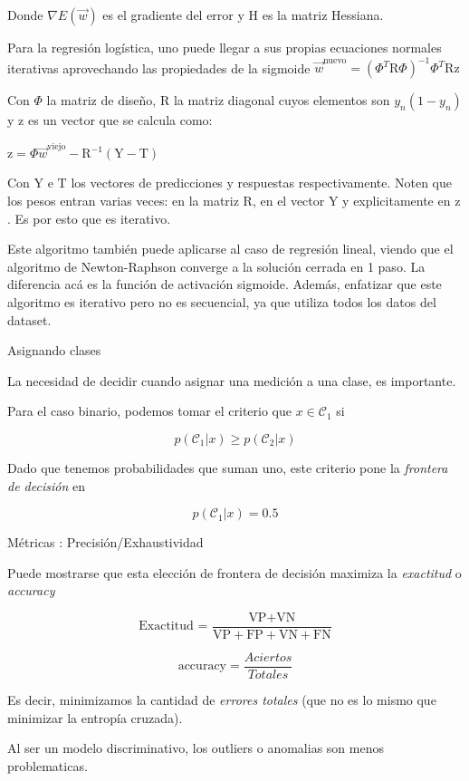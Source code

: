 \documentclass[twoside,11pt]{article}
\begin{document}
Donde $\nabla E(\vec{w})$ es el gradiente del error y $\text{H}$ es la matriz Hessiana.

Para la regresión logística, uno puede llegar a sus propias ecuaciones normales iterativas 
aprovechando las propiedades de la sigmoide
$\vec{w}^{\text{nuevo}}=( \Phi^{T}\text{R}\Phi )^{-1}\Phi^{T}\text{R}\text{z}$

Con $\Phi$ la matriz de diseño, $\text{R}$ la matriz diagonal cuyos elementos son $y_{n}(1-y_{n})$ y $\text{z}$ 
es un vector que se calcula como:

$\text{z}=\Phi\vec{w}^{\text{viejo}}-\text{R}^{-1}(\text{Y}-\text{T})$

Con $\text{Y}$ e $\text{T}$ los vectores de predicciones y respuestas respectivamente. 
Noten que los pesos entran varias veces: en la matriz $\text{R}$, en el vector $\text{Y}$ y 
explicitamente en $\text{z}$. Es por esto que es iterativo.

Este algoritmo también puede aplicarse al caso de regresión lineal, viendo que el algoritmo 
de Newton-Raphson converge a la solución cerrada en 1 paso. La diferencia acá es la función 
de activación sigmoide. Además, enfatizar que este algoritmo es iterativo pero no es secuencial, 
ya que utiliza todos los datos del dataset.

Asignando clases

La necesidad de decidir cuando asignar una medición a una clase, es importante.

Para el caso binario, podemos tomar el criterio que $x\in\mathcal{C}_1$ si

$$p(\mathcal{C}_{1}|x)\geq p(\mathcal{C}_{2}|x)$$

Dado que tenemos probabilidades que suman uno, este criterio pone la \textit{frontera de decisión} en

$$p(\mathcal{C}_{1}|x)=0.5$$

Métricas : Precisión/Exhaustividad

Puede mostrarse que esta elección de frontera de decisión maximiza la \textit{exactitud} o \textit{accuracy}

$$\text{Exactitud = }\frac{\text{VP}+\text{VN}}{\text{VP}+\text{FP}+\text{VN}+\text{FN}}$$

$$
\mathrm{accuracy} = \frac{Aciertos}{Totales}
$$

Es decir, minimizamos la cantidad de \textit{errores totales} (que no es lo mismo que minimizar la entropía cruzada).

Al ser un modelo discriminativo, los outliers o anomalias son menos problematicas.
\end{document}
